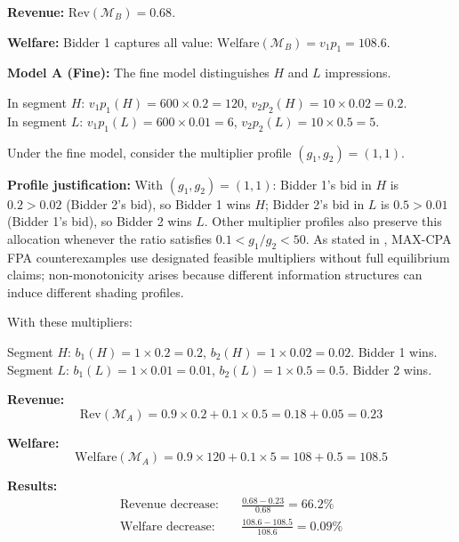 \documentclass{article}
\theoremstyle{plain}
\theoremstyle{definition}
\theoremstyle{remark}
\newcommand{\cM}{\mathcal{M}}
\begin{document}
\textbf{Revenue:} $\text{Rev}(\cM_B) = 0.68$.

\textbf{Welfare:} Bidder 1 captures all value: $\text{Welfare}(\cM_B) = v_1 \hat{p}_1 = 108.6$.

\textbf{Model A (Fine):} The fine model distinguishes $H$ and $L$ impressions.

In segment $H$: $v_1 p_1(H) = 600 \times 0.2 = 120$, $v_2 p_2(H) = 10 \times 0.02 = 0.2$.\\
In segment $L$: $v_1 p_1(L) = 600 \times 0.01 = 6$, $v_2 p_2(L) = 10 \times 0.5 = 5$.

Under the fine model, consider the multiplier profile $(g_1, g_2) = (1, 1)$.

\textbf{Profile justification:} With $(g_1, g_2) = (1, 1)$: Bidder 1's bid in $H$ is $0.2 > 0.02$ (Bidder 2's bid), so Bidder 1 wins $H$; Bidder 2's bid in $L$ is $0.5 > 0.01$ (Bidder 1's bid), so Bidder 2 wins $L$. Other multiplier profiles also preserve this allocation whenever the ratio satisfies $0.1 < g_1/g_2 < 50$. As stated in , MAX-CPA FPA counterexamples use designated feasible multipliers without full equilibrium claims; non-monotonicity arises because different information structures can induce different shading profiles.

With these multipliers:

Segment $H$: $b_1(H) = 1 \times 0.2 = 0.2$, $b_2(H) = 1 \times 0.02 = 0.02$. Bidder 1 wins.\\
Segment $L$: $b_1(L) = 1 \times 0.01 = 0.01$, $b_2(L) = 1 \times 0.5 = 0.5$. Bidder 2 wins.

\textbf{Revenue:}
\begin{equation}
\text{Rev}(\cM_A) = 0.9 \times 0.2 + 0.1 \times 0.5 = 0.18 + 0.05 = 0.23
\end{equation}

\textbf{Welfare:}
\begin{equation}
\text{Welfare}(\cM_A) = 0.9 \times 120 + 0.1 \times 5 = 108 + 0.5 = 108.5
\end{equation}

\textbf{Results:}
\begin{align}
\text{Revenue decrease:} \quad & \frac{0.68 - 0.23}{0.68} = 66.2\% \\
\text{Welfare decrease:} \quad & \frac{108.6 - 108.5}{108.6} = 0.09\%
\end{align}
\end{document}
